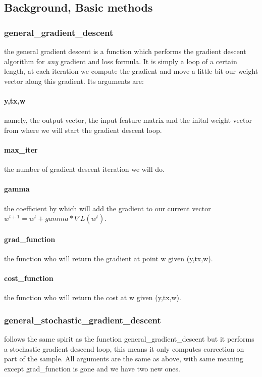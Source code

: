 \documentclass[10pt,conference,compsocconf]{IEEEtran}
\begin{document}
\subsection{Background, Basic methods}
\subsubsection{general\_gradient\_descent}
the general gradient descent is a function which performs the gradient descent algorithm for \emph{any} gradient and loss formula. It is simply a loop of a certain length, at each iteration we compute the gradient and move a little bit our weight vector along this gradient. Its arguments are:
\paragraph{y,tx,w} namely, the output vector, the input feature matrix and
the inital weight vector from where we will start the gradient descent
loop.
\paragraph{max\_iter} the number of gradient descent iteration we will do.
\paragraph{gamma} the coefficient by which will add the gradient to our current
vector \(w^{t+1}=w^{t}+gamma*\nabla L(w^{t})\).
\paragraph{grad\_function} the function who will return the gradient at point
w given (y,tx,w).
\paragraph{cost\_function} the function who will return the cost at w given
(y,tx,w).


\subsubsection{general\_stochastic\_gradient\_descent}
follows the same spirit as the function general\_gradient\_descent
but it performs a stochastic gradient descend loop, this means it only computes correction on part of the sample. All arguments are the same as above, with same meaning except grad\_function is gone and we have two new ones.
\end{document}
